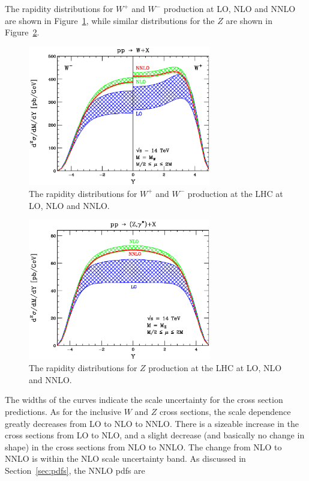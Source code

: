 \documentclass[12pt]{iopart}
\begin{document}
The rapidity distributions for $W^+$ and $W^-$ production at LO, NLO and NNLO are shown in
Figure~\ref{fig:nnlo_w}, while similar distributions for the $Z$ are shown in Figure~\ref{fig:nnlo_z}.
%
\begin{figure}[t]
\begin{center}
\includegraphics[width=8cm]{LHC_Wpm_Mw.ps}
\end{center}
\caption{
The rapidity distributions for $W^+$ and $W^-$ production at the LHC at LO, NLO and NNLO. } 
\label{fig:nnlo_w}
\end{figure}
%
%
\begin{figure}[t]
\begin{center}
\includegraphics[width=8cm]{LHC_Z_Mz.ps}
\end{center}
\caption{
The rapidity distributions for $Z$ production at the LHC at LO, NLO and NNLO. } 
\label{fig:nnlo_z}
\end{figure}
%
The widths of the curves indicate the scale uncertainty for the cross section predictions. As for the inclusive $W$ and $Z$ cross sections, the scale
dependence greatly decreases from LO to NLO to NNLO. There is a sizeable increase in the cross sections from LO
to NLO, and a slight decrease (and basically no change in shape) in the cross sections from NLO to NNLO. The
change from NLO to NNLO is within the NLO scale uncertainty band. As discussed in Section~\ref{sec:pdfs}, the NNLO pdfs are
\end{document}

